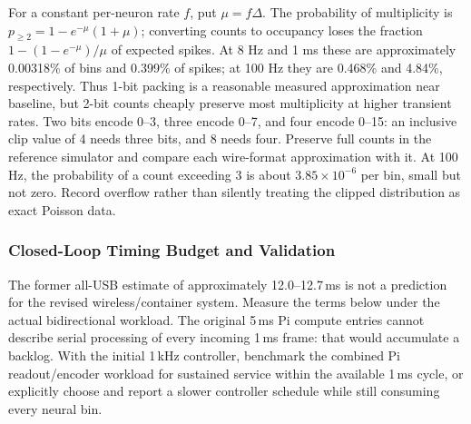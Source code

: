 For a constant per-neuron rate $f$, put $\mu=f\Delta$. The probability of multiplicity is $p_{\ge2}=1-e^{-\mu}(1+\mu)$; converting counts to occupancy loses the fraction $1-(1-e^{-\mu})/\mu$ of expected spikes. At 8 Hz and 1 ms these are approximately 0.00318\% of bins and 0.399\% of spikes; at 100 Hz they are 0.468\% and 4.84\%, respectively. Thus 1-bit packing is a reasonable measured approximation near baseline, but 2-bit counts cheaply preserve most multiplicity at higher transient rates. Two bits encode 0--3, three encode 0--7, and four encode 0--15: an inclusive clip value of 4 needs three bits, and 8 needs four. Preserve full counts in the reference simulator and compare each wire-format approximation with it. At 100 Hz, the probability of a count exceeding 3 is about $3.85\times10^{-6}$ per bin, small but not zero. Record overflow rather than silently treating the clipped distribution as exact Poisson data.

\subsubsection{Closed-Loop Timing Budget and Validation}
The former all-USB estimate of approximately 12.0--12.7\,ms is not a prediction for the revised wireless/container system. Measure the terms below under the actual bidirectional workload. The original 5\,ms Pi compute entries cannot describe serial processing of every incoming 1\,ms frame: that would accumulate a backlog. With the initial 1\,kHz controller, benchmark the combined Pi readout/encoder workload for sustained service within the available 1\,ms cycle, or explicitly choose and report a slower controller schedule while still consuming every neural bin.

